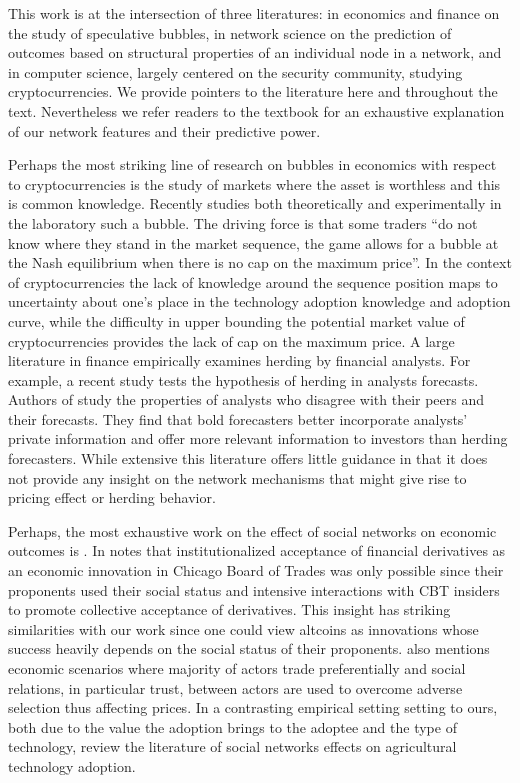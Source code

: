 This work is at the intersection of three literatures: in economics and finance on the study of speculative bubbles, in network science on the prediction of outcomes based on structural properties of an individual node in a network, and in computer science, largely centered on the security community, studying cryptocurrencies.
We provide pointers to the literature here and throughout the text. Nevertheless we refer readers to the textbook \cite{KleinbergNetworks} for an exhaustive explanation of our network features and their predictive power.

Perhaps the most striking line of research on bubbles in economics with respect to cryptocurrencies is the study of markets where the asset is worthless and this is common knowledge. 
Recently \cite{moinas2013bubble} studies both theoretically and experimentally in the laboratory such a bubble. 
The driving force is that some traders ``do not know where they stand in the market sequence, the game allows for
a bubble at the Nash equilibrium when there is no cap on the maximum price''.
In the context of cryptocurrencies the lack of knowledge around the sequence position maps to uncertainty about one's place in the technology adoption knowledge and adoption curve, while the difficulty in upper bounding the potential market value of cryptocurrencies provides the lack of cap on the maximum price. 
A large literature in finance empirically examines herding by financial analysts. For example, a recent study \cite{jegadeesh2009analysts} tests the hypothesis of herding in analysts forecasts. 
Authors of \cite{clement2005financial} study the properties of analysts who disagree with their peers and their forecasts. They find that bold forecasters better incorporate analysts' private information and offer more relevant information to investors than herding forecasters.
While extensive this literature offers little guidance in that it does not provide any insight on the network mechanisms that might give rise to pricing effect or herding behavior.

Perhaps, the most exhaustive work on the effect of social networks on economic outcomes is \cite{Granovetter-outcomes}. In \cite{Granovetter-outcomes} notes that institutionalized acceptance of financial derivatives as an economic innovation in Chicago Board of Trades was only possible since their proponents used their social status and intensive interactions with CBT insiders to promote collective acceptance of derivatives. This insight has striking similarities with our work since one could view altcoins as innovations whose success heavily depends on the social status of their proponents. \cite{Granovetter-outcomes} also mentions economic scenarios where majority of actors trade preferentially and social relations, in particular trust, between actors are used to overcome adverse selection thus affecting prices.
In a contrasting empirical setting setting to ours, both due to the value the adoption brings to the adoptee and the type of technology, \cite{maertens2013measuring} review the literature of social networks effects on agricultural technology adoption.

